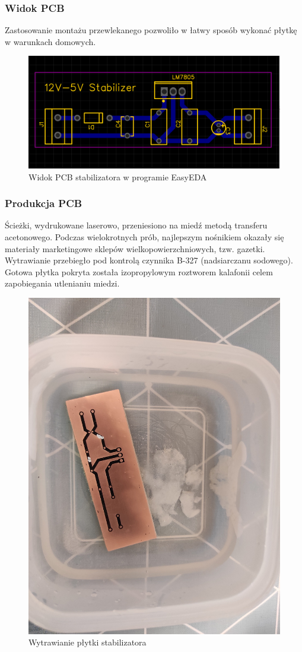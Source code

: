 \documentclass[10pt,a4paper]{article}
\begin{document}
		\subsubsection{Widok PCB}
		Zastosowanie montażu przewlekanego pozwoliło w łatwy sposób wykonać płytkę w warunkach domowych.
		\begin{figure}[H]
			\centering
			\includegraphics[width=0.7\linewidth]{stabilizator_PCB}
			\caption{Widok PCB stabilizatora w programie EasyEDA}
			\label{fig:stabilizatorpcb}
		\end{figure}
		\subsubsection{Produkcja PCB}
		Ścieżki, wydrukowane laserowo, przeniesiono na miedź metodą transferu acetonowego. Podczas wielokrotnych prób, najlepszym nośnikiem okazały się materiały marketingowe sklepów wielkopowierzchniowych, tzw. gazetki. Wytrawianie przebiegło pod kontrolą czynnika B-327 (nadsiarczanu sodowego). Gotowa płytka pokryta została izopropylowym roztworem kalafonii celem zapobiegania utlenianiu miedzi.
		\begin{figure}
			\centering
			\includegraphics[width=0.7\linewidth]{wytrawianie}
			\caption[Wytrawianie stabilizatora]{Wytrawianie płytki stabilizatora}
			\label{fig:wytrawianie}
		\end{figure}
	
\end{document}
